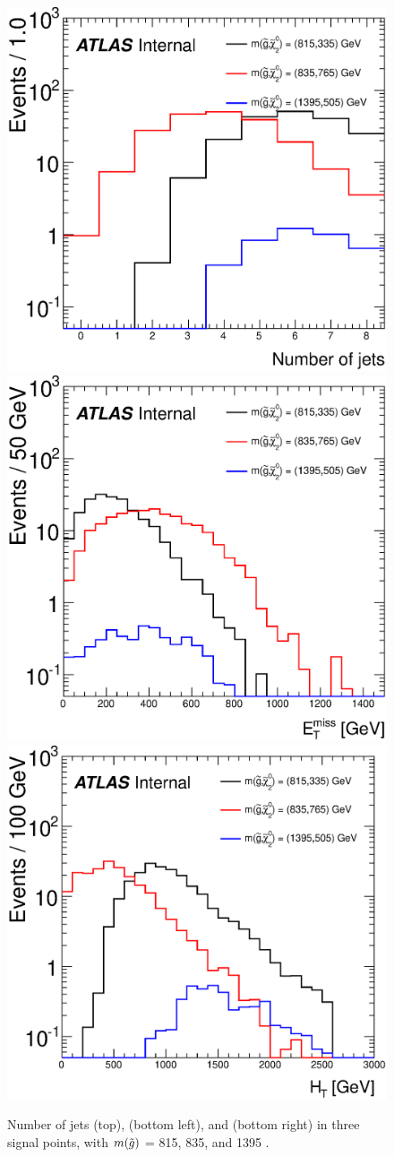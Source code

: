 \begin{figure}[!htb]
\centering
\includegraphics[width=.48\textwidth]{figures/signalacceptcontam/njets_R.eps}\\
\includegraphics[width=.48\textwidth]{figures/signalacceptcontam/met_R.eps}
\includegraphics[width=.48\textwidth]{figures/signalacceptcontam/ht_R.eps}\\
\caption{
Number of jets (top), \HT (bottom left), and \met (bottom right) in three signal points, with $m({\tilde g})$ = 815, 835, and 1395 \gev. 
\label{fig:sig_njets}
}
\end{figure}

